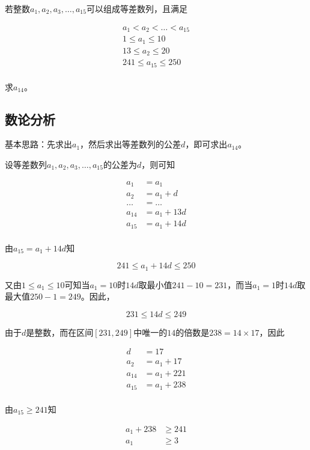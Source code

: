 

若整数$a_1, a_2, a_3, \dots, a_{15}$可以组成等差数列，且满足

\begin{align*}
  a_1 < a_2 < \dots < a_{15} \\
  1 \le a_1 \le 10 \\
  13 \le a_2 \le 20 \\
  241 \le a_{15} \le 250 \\
\end{align*}

求$a_{14}$。


\subsection{数论分析}

基本思路：先求出$a_1$，然后求出等差数列的公差$d$，即可求出$a_{14}$。

设等差数列$a_1, a_2, a_3, \dots, a_{15}$的公差为$d$，则可知

\begin{align*}
  a_1 &= a_1 \\
  a_2 &= a_1 + d \\
  \dots &= \dots \\
  a_{14} &= a_1 + 13d \\
  a_{15} &= a_1 + 14d \\
\end{align*}

由$a_{15} = a_1 + 14d$知

\[ 241 \le a_1 + 14d \le 250 \]

又由$1 \le a_1 \le 10$可知当$a_1 = 10$时$14d$取最小值$241 - 10 = 231$，而当$a_1 = 1$时$14d$取最大值$250 - 1 = 249$。因此，

\[ 231 \le 14d \le 249 \]

由于$d$是整数，而在区间$[231, 249]$中唯一的$14$的倍数是$238 = 14\times17$，因此

\begin{align*}
  d &= 17 \\
  a_2 &= a_1 + 17 \\
  a_{14} &= a_1 + 221 \\
  a_{15} &= a_1 + 238 \\
\end{align*}

由$a_{15} \ge 241$知

\begin{align*}
  a_1 + 238 &\ge 241 \\
  a_1 &\ge 3 \\
\end{align*}

